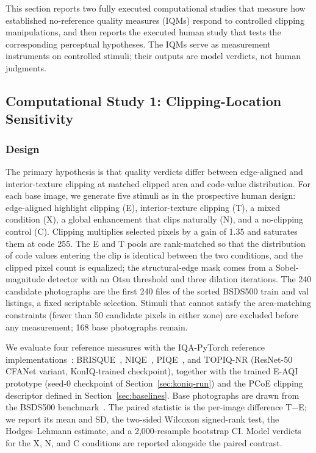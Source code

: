 \documentclass[5p,times,twocolumn]{elsarticle}
\begin{document}
This section reports two fully executed computational studies that measure
how established no-reference quality measures (IQMs) respond to controlled
clipping manipulations, and then reports the executed human study that tests
the corresponding perceptual hypotheses. The IQMs serve as measurement
instruments on controlled stimuli; their outputs are model verdicts, not
human judgments.

\subsection{Computational Study 1: Clipping-Location Sensitivity}
\label{sec:study1}

\subsubsection{Design}

The primary hypothesis is that quality verdicts differ between edge-aligned
and interior-texture clipping at matched clipped area and code-value
distribution. For each base image, we generate five stimuli as in the
prospective human design: edge-aligned highlight clipping (E), interior-texture
clipping (T), a mixed condition (X), a global enhancement that clips
naturally (N), and a no-clipping control (C). Clipping multiplies selected
pixels by a gain of 1.35 and saturates them at code 255. The E and T pools
are rank-matched so that the distribution of code values entering the clip
is identical between the two conditions, and the clipped pixel count is
equalized; the structural-edge mask comes from a Sobel-magnitude detector
with an Otsu threshold and three dilation iterations. The 240 candidate
photographs are the first 240 files of the sorted BSDS500 train and val
listings, a fixed scriptable selection. Stimuli that cannot satisfy the
area-matching constraints (fewer than 50 candidate pixels in either zone) are
excluded before any measurement; 168 base photographs remain.

We evaluate four reference measures with the IQA-PyTorch reference
implementations~\cite{pyiqa2024}: BRISQUE~\cite{mittal2012},
NIQE~\cite{mittal2013}, PIQE~\cite{venkatanath2015}, and TOPIQ-NR
\cite{chen2024topiq} (ResNet-50 CFANet variant, KonIQ-trained checkpoint),
together with the trained E-AQI prototype (seed-0 checkpoint of
Section~\ref{sec:koniq-run}) and the PCoE clipping descriptor defined in
Section~\ref{sec:baselines}. Base photographs are drawn from the BSDS500
benchmark~\cite{arbelaez2011bsds500}. The paired statistic is the per-image
difference T$-$E; we report its mean and SD, the two-sided Wilcoxon
signed-rank test, the Hodges--Lehmann estimate, and a 2{,}000-resample
bootstrap CI. Model verdicts for the X, N, and C conditions are reported
alongside the paired contrast.
\end{document}
